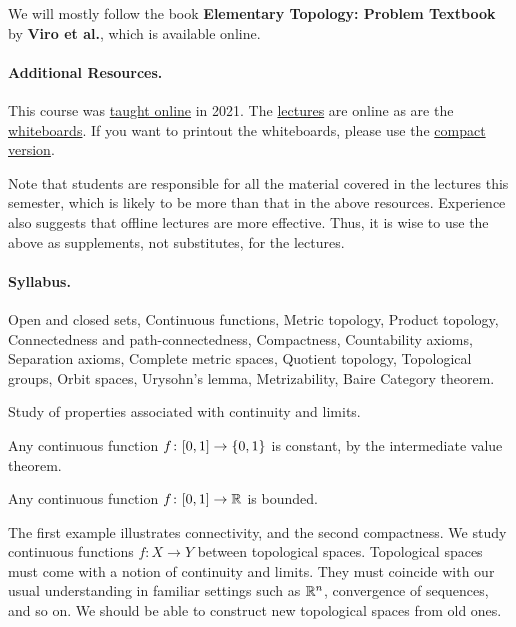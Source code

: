 We will mostly follow the book \textbf{Elementary Topology: Problem
Textbook} by \textbf{Viro et al.}, which is available online.

\paragraph{Additional Resources.}
This course was
\href{https://math.iisc.ac.in/~gadgil/topology-2021/index.html}{taught online}
in 2021.
The \href{https://math.iisc.ac.in/~gadgil/topology-2021/all-lectures/}{lectures}
are online as are the
\href{https://math.iisc.ac.in/~gadgil/topology-2021/Whiteboard.pdf}{whiteboards}.
If you want to printout the whiteboards, please use the
\href{https://math.iisc.ac.in/~gadgil/topology-2025/notes.pdf}{compact version}.

Note that students are responsible for all the material covered in the
lectures this semester, which is likely to be more than that in the
above resources.
Experience also suggests that offline lectures are more
effective.
Thus, it is wise to use the above as supplements, not
substitutes, for the lectures.

\paragraph{Syllabus.}
Open and closed sets, Continuous functions, Metric topology, Product
topology, Connectedness and path-connectedness, Compactness,
Countability axioms, Separation axioms, Complete metric spaces, Quotient
topology, Topological groups, Orbit spaces, Urysohn's lemma,
Metrizability, Baire Category theorem.

\begin{center}
    Study of properties associated with continuity and limits.
\end{center}
\begin{examples}
    \item Any continuous function $f\colon [0, 1] \to \{0, 1\}$ is
    constant, by the intermediate value theorem.
    \item Any continuous function $f\colon [0, 1] \to \mathbb{R}$ is bounded.
\end{examples}
The first example illustrates connectivity, and the second compactness.
We study continuous functions $f\colon X \to Y$ between topological spaces.
Topological spaces must come with a notion of continuity and limits.
They must coincide with our usual understanding in familiar settings such as
$\mathbb{R}^n$, convergence of sequences, and so on.
We should be able to construct new topological spaces from old ones.

